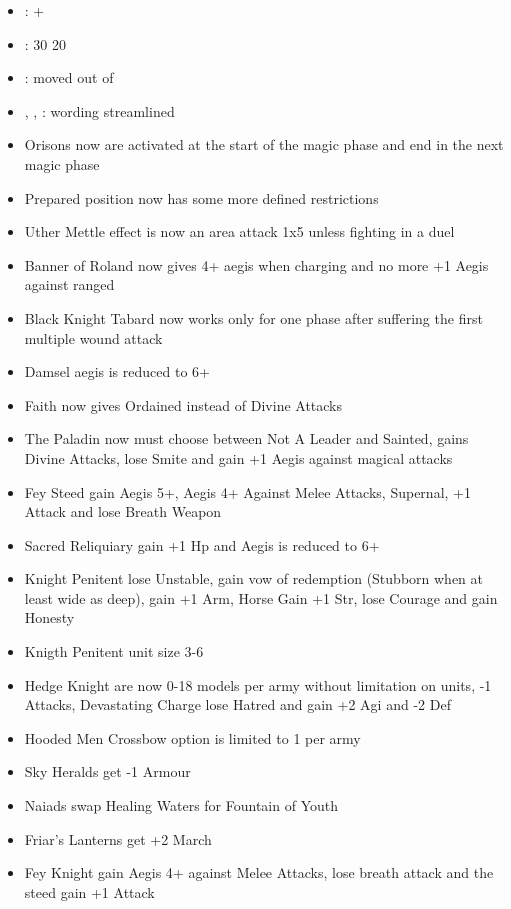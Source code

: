 
\largefontsize{}

\subtitle{2023 Beta 1 Hotfix 1}

\begin{itemize}
	\item \blackknightstabard{}: + \oneuseonly{}
	\item \ordosergeants{}: 30 \costdown{} 20
	\item \heraldicsteed{}: \harnessed{} moved out of \devastatingcharge{}
	\item \honour{}, \relentless{}, \sacredrelic{}: wording streamlined
\end{itemize}

\subtitle{2023 Beta 1}

\begin{itemize}
	\item Orisons now are activated at the start of the magic phase and end in the next magic phase
	\item Prepared position now has some more defined restrictions
	\item Uther Mettle effect is now an area attack 1x5 unless fighting in a duel
	\item Banner of Roland now gives 4+ aegis when charging and no more +1 Aegis against ranged
	\item Black Knight Tabard now works only for one phase after suffering the first multiple wound attack
	\item Damsel aegis is reduced to 6+
	\item Faith now gives Ordained instead of Divine Attacks
	\item The Paladin now must choose between Not A Leader and Sainted, gains Divine Attacks, lose Smite and gain +1 Aegis against magical attacks
	\item Fey Steed gain Aegis 5+, Aegis 4+ Against Melee Attacks, Supernal, +1 Attack and lose Breath Weapon
	\item Sacred Reliquiary gain +1 Hp and Aegis is reduced to 6+
	\item Knight Penitent lose Unstable, gain vow of redemption (Stubborn when at least wide as deep), gain +1 Arm, Horse Gain +1 Str, lose Courage and gain Honesty
	\item Knigth Penitent unit size 3-6
	\item Hedge Knight are now 0-18 models per army without limitation on units, -1 Attacks, Devastating Charge lose Hatred and gain +2 Agi and -2 Def
	\item Hooded Men Crossbow option is limited to 1 per army
	\item Sky Heralds get -1 Armour
	\item Naiads swap Healing Waters for Fountain of Youth
	\item Friar's Lanterns get +2 March
	\item Fey Knight gain Aegis 4+ against Melee Attacks, lose breath attack and the steed gain +1 Attack
\end{itemize}

